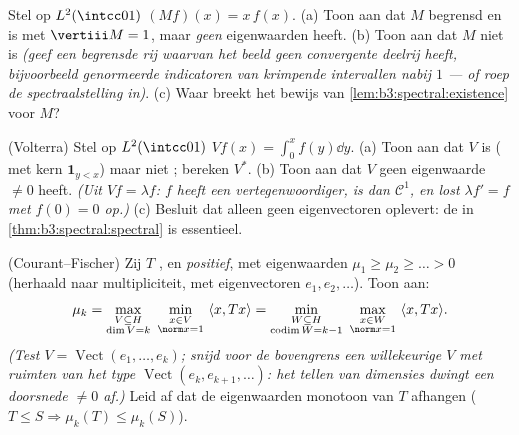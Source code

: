 \begin{exercise}[$\star\star$]\label{exo:b3:spectral:6}
Stel op $L^2(\intcc01)$ $(Mf)(x) = x\,f(x)$.
(a) Toon aan dat $M$ begrensd en  is met $\vertiii
M = 1$, maar \emph{geen} eigenwaarden heeft.
(b) Toon aan dat $M$ niet  is \emph{(geef een begrensde
rij waarvan het beeld geen convergente deelrij heeft, bijvoorbeeld
genormeerde indicatoren van krimpende intervallen nabij $1$ ---
of roep de spectraalstelling in)}.
(c) Waar breekt het bewijs van \cref{lem:b3:spectral:existence}
voor $M$?
\end{exercise}

\begin{exercise}[$\star\star$]\label{exo:b3:spectral:7}
(Volterra) Stel op $L^2(\intcc01)$ $Vf(x) = \int_0^xf(y)\dd y$.
(a) Toon aan dat $V$  is ( met kern
$\mathbf 1_{y < x}$) maar niet ; bereken $V^*$.
(b) Toon aan dat $V$ geen eigenwaarde $\neq 0$ heeft. \emph{(Uit
$Vf = \lambda f$: $f$ heeft een  vertegenwoordiger, is
dan $\mathcal C^1$, en lost $\lambda f' = f$ met $f(0) = 0$
op.)}
(c) Besluit dat  alleen geen eigenvectoren oplevert:
de  in \cref{thm:b3:spectral:spectral} is
essentieel.
\end{exercise}

\begin{exercise}[$\star\star\star$]\label{exo:b3:spectral:8}
(Courant--Fischer) Zij $T$ ,  en
\emph{positief}, met eigenwaarden $\mu_1 \geq \mu_2 \geq \dots >
0$ (herhaald naar multipliciteit, met eigenvectoren $e_1, e_2,
\dots$). Toon aan:
\[
\mu_{k} = \max_{\substack{V \subseteq H \\ \dim V = k}}\
\min_{\substack{x \in V\\ \norm x = 1}}\ \langle x, Tx\rangle
= \min_{\substack{W \subseteq H\\ \operatorname{codim}W =
k-1}}\ \max_{\substack{x\in W\\ \norm x = 1}}\ \langle x,
Tx\rangle .
\]
\emph{(Test $V = \operatorname{Vect}(e_1,\dots,e_k)$; snijd voor
de bovengrens een willekeurige $V$ met ruimten van het type
$\operatorname{Vect}(e_k, e_{k+1}, \dots)$: het tellen van
dimensies dwingt een doorsnede $\neq 0$ af.)} Leid af dat de
eigenwaarden monotoon van $T$ afhangen ($T \leq S \Rightarrow
\mu_k(T) \leq \mu_k(S)$).
\end{exercise}

